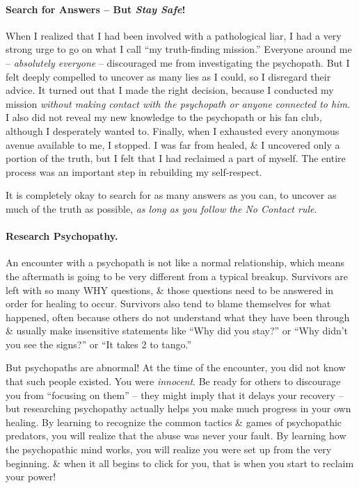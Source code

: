 \documentclass{article}
\numberwithin{equation}{section}
\begin{document}
\paragraph{Search for Answers -- But \textit{Stay Safe}!} When I realized that I had been involved with a pathological liar, I had a very strong urge to go on what I call ``my truth-finding mission.'' Everyone around me -- \textit{absolutely everyone} -- discouraged me from investigating the psychopath. But I felt deeply compelled to uncover as many lies as I could, so I disregard their advice. It turned out that I made the right decision, because I conducted my mission \textit{without making contact with the psychopath or anyone connected to him}. I also did not reveal my new knowledge to the psychopath or his fan club, although I desperately wanted to. Finally, when I exhausted every anonymous avenue available to me, I stopped. I was far from healed, \& I uncovered only a portion of the truth, but I felt that I had reclaimed a part of myself. The entire process was an important step in rebuilding my self-respect.

It is completely okay to search for as many answers as you can, to uncover as much of the truth as possible, \textit{as long as you follow the No Contact rule}.

\paragraph{Research Psychopathy.} An encounter with a psychopath is not like a normal relationship, which means the aftermath is going to be very different from a typical breakup. Survivors are left with so many WHY questions, \& those questions need to be answered in order for healing to occur. Survivors also tend to blame themselves for what happened, often because others do not understand what they have been through \& usually make insensitive statements like ``Why did you stay?'' or ``Why didn't you see the signs?'' or ``It takes 2 to tango.''

But psychopaths are abnormal! At the time of the encounter, you did not know that such people existed. You were \textit{innocent}. Be ready for others to discourage you from ``focusing on them'' -- they might imply that it delays your recovery -- but researching psychopathy actually helps you make much progress in your own healing. By learning to recognize the common tactics \& games of psychopathic predators, you will realize that the abuse was never your fault. By learning how the psychopathic mind works, you will realize you were set up from the very beginning. \& when it all begins to click for you, that is when you start to reclaim your power!
\end{document}
